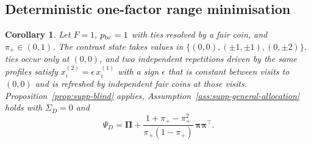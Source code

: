 \documentclass[12pt,a4paper]{article}
\newtheorem{corollary}{Corollary}
\theoremstyle{definition}
\theoremstyle{remark}\newtheorem{remark}{Remark}
\numberwithin{equation}{section}
\begin{document}
\subsection{Deterministic one-factor range minimisation}
\begin{corollary}\label{cor:supp-det1}
Let $F=1$, $p_{\rm bc}=1$ with ties resolved by a fair coin, and $\pi_+\in(0,1)$. The contrast state takes values in $\{(0,0),(\pm1,\pm1),(0,\pm2)\}$, ties occur only at $(0,0)$, and two independent repetitions driven by the same profiles satisfy $x^{(2)}_i=\epsilon\,x^{(1)}_i$ with a sign $\epsilon$ that is constant between visits to $(0,0)$ and is refreshed by independent fair coins at those visits. Proposition~\ref{prop:supp-blind} applies, Assumption~\ref{ass:supp-general-allocation} holds with $\Sigma_D=0$ and
\begin{equation}\label{eq:supp-det1-psi}
 \Psi_D=\bm\Pi+\frac{1+\pi_+-\pi_+^2}{\pi_+(1-\pi_+)}\,\bm\pi\bm\pi^\top .
\end{equation}
\end{corollary}
\end{document}
